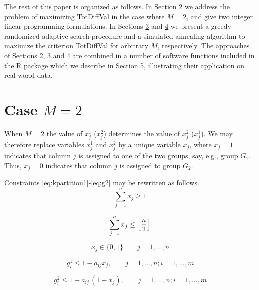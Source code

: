 The rest of this paper is organized as follows. In Section \hyperref[casemtwo]{2} we address the problem of maximizing TotDiffVal in the case where \(M=2\), and give two integer linear programming formulations. In Sections \hyperref[GRASP]{3} and \hyperref[SA]{4} we present a greedy randomized adaptive search procedure and a simulated annealing algorithm to maximize the criterion TotDiffVal for arbitrary \(M\), respectively. The approaches of Sections \hyperref[casemtwo]{2}, \hyperref[GRASP]{3} and \hyperref[SA]{4} are combined in a number of software functions included in the R package  \citep{MHC2025} which we describe in Section \hyperref[implementation]{5}, illustrating their application on real-world data.

\section{\texorpdfstring{Case \(M=2\)}{Case M=2}}\label{casemtwo}

When \(M=2\) the value of \(x_j^1\) (\(x_j^2\)) determines the value of \(x_j^2\) (\(x_j^1\)). We may therefore replace variables \(x_j^1\) and \(x_j^2\) by a unique variable \(x_j\), where \(x_j=1\) indicates that column \(j\) is assigned to one of the two groups, say, e.g., group \(G_1\). Thus, \(x_j=0\) indicates that column \(j\) is assigned to group \(G_2\).

Constraints \eqref{eq:kpartition1}-\eqref{eq:g2} may be rewritten as follows.
\begin{equation}
\sum_{j=1}^n x_j\geq 1
\label{eq:twopart1x}
\end{equation}

\begin{equation}
\sum_{j=1}^n x_j\leq \Bigl\lfloor\dfrac{n}{2}\Bigr\rfloor
\label{eq:twopart2x}
\end{equation}

\begin{equation}
x_j\in \{0,1\} \quad \quad j=1,\dots,n
\label{eq:twox01}
\end{equation}

\begin{equation}
g_i^1\leq 1 - a_{ij}x_j, \quad \quad j=1,\dots,n; i=1,\dots,m
\label{eq:twog1}
\end{equation}

\begin{equation}
g_i^2\leq 1 - a_{ij}\,(1-x_j), \quad \quad j=1,\dots,n; i=1,\dots,m
\label{eq:twog2}
\end{equation}

